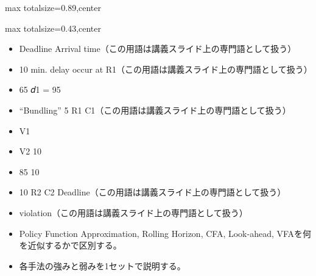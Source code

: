 \begin{minipage}[t]{0.58\textwidth}
\begin{adjustbox}{max totalsize={\textwidth}{0.89\textheight},center}
\begin{minipage}{\textwidth}
\end{minipage}
\end{adjustbox}
\end{minipage}


\clearpage
{}
\begin{minipage}[t]{0.405\textwidth}
\begin{adjustbox}{max totalsize={\textwidth}{0.43\textheight},center}
\begin{minipage}{\textwidth}\scriptsize
{}\begin{itemize}
\item Deadline Arrival time（この用語は講義スライド上の専門語として扱う）
\item 10 min. delay occur at R1（この用語は講義スライド上の専門語として扱う）
\item 65 𝑑1 = 95
\item “Bundling” 5 R1 C1（この用語は講義スライド上の専門語として扱う）
\item V1
\item V2 10
\item 85 10
\item 10 R2 C2 Deadline（この用語は講義スライド上の専門語として扱う）
\item violation（この用語は講義スライド上の専門語として扱う）
\end{itemize}\begin{itemize}
\item Policy Function Approximation, Rolling Horizon, CFA, Look-ahead, VFAを何を近似するかで区別する。
\item 各手法の強みと弱みを1セットで説明する。
\end{itemize}
\end{minipage}
\end{adjustbox}
\end{minipage}\hfill
